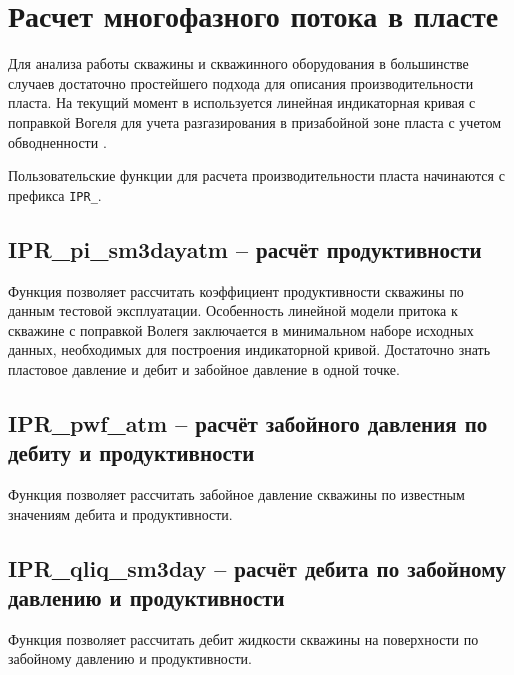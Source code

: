 
\section{Расчет многофазного потока в пласте}
Для анализа работы скважины и скважинного оборудования в большинстве случаев достаточно простейшего подхода для описания производительности пласта. На текущий момент в \unf{} используется линейная индикаторная кривая с поправкой Вогеля для учета разгазирования в призабойной зоне пласта с учетом обводненности \cite{KBrown_AL_methods_vol4}. 

Пользовательские функции для расчета производительности пласта начинаются с префикса  \texttt{IPR_}. 

\subsection{IPR\_pi\_sm3dayatm – расчёт продуктивности}
Функция позволяет рассчитать коэффициент продуктивности скважины по данным тестовой эксплуатации. Особенность линейной модели притока к скважине с поправкой Волегя заключается в минимальном наборе исходных данных, необходимых для построения индикаторной кривой. Достаточно знать пластовое давление и дебит и забойное давление в одной точке.



\subsection{IPR\_pwf\_atm – расчёт забойного давления по дебиту и продуктивности}
Функция позволяет рассчитать забойное давление скважины по известным значениям дебита и продуктивности.


\subsection{IPR\_qliq\_sm3day – расчёт дебита по забойному давлению и продуктивности}
Функция позволяет рассчитать дебит жидкости скважины на поверхности по забойному давлению и продуктивности.




\newpage
